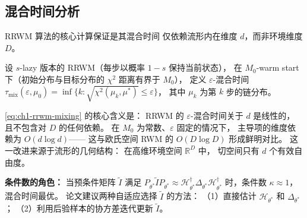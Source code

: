 
\subsection{混合时间分析}\label{sec:ch1-mixing}

RRWM 算法的核心计算保证是其混合时间
仅依赖流形内在维度 $d$，而非环境维度 $D$。

设 $s$-lazy 版本的 RRWM（每步以概率 $1-s$ 保持当前状态），
在 $M_0$-warm start 下（初始分布与目标分布的 $\chi^2$ 距离有界于 $M_0$），
定义 $\varepsilon$-混合时间
$\tau_{\mathrm{mix}}(\varepsilon,\mu_0)
=\inf\{k:\sqrt{\chi^2(\mu_k,\mu^*)}\le\varepsilon\}$，
其中 $\mu_k$ 为第 $k$ 步的链分布。


\cref{eq:ch1-rrwm-mixing} 的核心含义是：
RRWM 的 $\varepsilon$-混合时间关于 $d$ 是线性的，
且不包含对 $D$ 的任何依赖。
在 $M_0$ 为常数、$\varepsilon$ 固定的情况下，
主导项的维度依赖为 $O(d\log d)$——
这与欧氏空间 RWM 的 $O(D\log D)$ 形成鲜明对比。
这一改进来源于流形的几何结构：
在高维环境空间 $\mathbb{R}^D$ 中，
切空间只有 $d$ 个有效自由度。

\textbf{条件数的角色：}
当预条件矩阵 $\widetilde{I}$ 满足
$P_{\theta^*}\widetilde{I}P_{\theta^*}\approx
\mathcal{H}_{\theta^*}^\dagger\Delta_{\theta^*}\mathcal{H}_{\theta^*}^\dagger$
时，条件数 $\kappa\approx 1$，混合时间最优。
论文建议两种自适应选择 $\widetilde{I}$ 的方法：
（1）直接估计 $\mathcal{H}_{\theta^*}$ 和 $\Delta_{\theta^*}$；
（2）利用后验样本的协方差迭代更新 $\widetilde{I}$。

